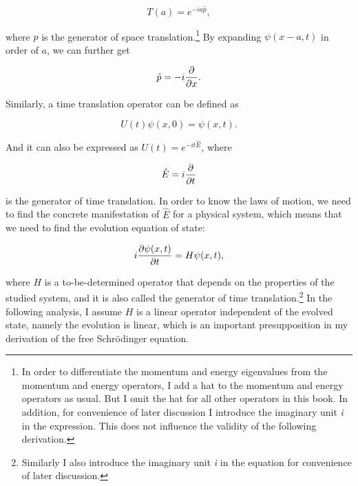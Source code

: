 \begin{equation}
T(a)=e^{-ia\hat{p}}, 
\label{}
\end{equation}

\noindent where $\hat{p}$ is the generator of space translation.\footnote{In order to differentiate the momentum and energy eigenvalues from the momentum and energy operators, I add a hat to the momentum and energy operators as usual. But I omit the hat for all other operators in this book. In addition, for convenience of later discussion I introduce the imaginary unit \emph{i} in the expression. This does not influence the validity of the following derivation.} By expanding $\psi(x-a,t)$  in order of $a$, we can further get 

\begin{equation}
\hat{p}=-i{ \partial \over \partial x}. 
\label{}
\end{equation}

\noindent Similarly, a time translation operator can be defined as 

\begin{equation}
U(t)\psi(x,0)=\psi(x,t). 
\label{}
\end{equation}

\noindent And it can also be expressed as $U(t) = e^{-it\hat{E}}$, where 

\begin{equation}
\hat{E}=i{\partial \over \partial t}
\label{}
\end{equation}

\noindent  is the generator of time translation. In order to know the laws of motion, we need to find the concrete manifestation of $\hat{E}$ for a physical system, which means that we need to find the evolution equation of state:

\begin{equation}
i{\partial \psi(x,t) \over \partial t} =H\psi(x,t),
\label{Sch0}
\end{equation}

\noindent  where $H$ is a to-be-determined operator that depends on the properties of the studied system, and it is also called the generator of time translation.\footnote{Similarly I also introduce the imaginary unit \emph{i} in the equation for convenience of later discussion.} In the following analysis, I assume $H$ is a linear operator independent of the evolved state, namely the evolution is linear, which is an important presupposition in my derivation of the free Schr\"{o}dinger equation. 

